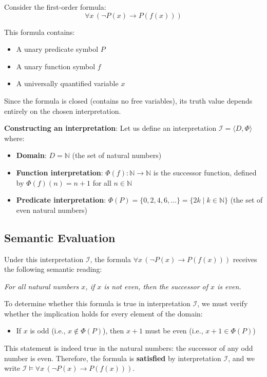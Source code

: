 \documentclass[11pt,a4paper]{article}
\theoremstyle{definition}
\theoremstyle{plain}
\theoremstyle{remark}
\newcommand{\N}{\mathbb{N}}
\begin{document}
Consider the first-order formula:
\[
\forall x \, (\neg P(x) \rightarrow P(f(x)))
\]

This formula contains:
\begin{itemize}
    \item A unary predicate symbol $P$
    \item A unary function symbol $f$
    \item A universally quantified variable $x$
\end{itemize}

Since the formula is closed (contains no free variables), its truth value depends entirely on the chosen interpretation.

\textbf{Constructing an interpretation}: Let us define an interpretation $\mathcal{I} = \langle D, \Phi \rangle$ where:
\begin{itemize}
    \item \textbf{Domain}: $D = \N$ (the set of natural numbers)
    \item \textbf{Function interpretation}: $\Phi(f) : \N \rightarrow \N$ is the successor function, defined by $\Phi(f)(n) = n + 1$ for all $n \in \N$
    \item \textbf{Predicate interpretation}: $\Phi(P) = \{0, 2, 4, 6, \dots\} = \{2k \mid k \in \N\}$ (the set of even natural numbers)
\end{itemize}

\subsection{Semantic Evaluation}

Under this interpretation $\mathcal{I}$, the formula $\forall x \, (\neg P(x) \rightarrow P(f(x)))$ receives the following semantic reading:

\textit{For all natural numbers $x$, if $x$ is not even, then the successor of $x$ is even.}

To determine whether this formula is true in interpretation $\mathcal{I}$, we must verify whether the implication holds for every element of the domain:
\begin{itemize}
    \item If $x$ is odd (i.e., $x \notin \Phi(P)$), then $x + 1$ must be even (i.e., $x + 1 \in \Phi(P)$)
\end{itemize}

This statement is indeed true in the natural numbers: the successor of any odd number is even. Therefore, the formula is \textbf{satisfied} by interpretation $\mathcal{I}$, and we write $\mathcal{I} \models \forall x \, (\neg P(x) \rightarrow P(f(x)))$.
\end{document}
